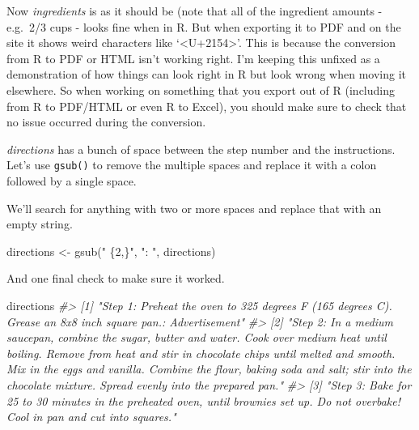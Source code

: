 \documentclass[
]{krantz}
\makeatletter
\newenvironment{Shaded}{\begin{snugshade}}{\end{snugshade}}
\newcommand{\CommentTok}[1]{\textcolor[rgb]{0.37,0.37,0.37}{\textit{#1}}}
\newcommand{\FunctionTok}[1]{\textcolor[rgb]{0,0,0}{#1}}
\newcommand{\NormalTok}[1]{#1}
\newcommand{\OtherTok}[1]{\textcolor[rgb]{0.37,0.37,0.37}{#1}}
\newcommand{\StringTok}[1]{\textcolor[rgb]{0.5,0.5,0.5}{#1}}
\newenvironment{kframe}{%
\medskip{}
\setlength{\fboxsep}{.8em}
 \def\at@end@of@kframe{}%
 \ifinner\ifhmode%
  \def\at@end@of@kframe{\end{minipage}}%
  \begin{minipage}{\columnwidth}%
 \fi\fi%
 \def\FrameCommand##1{\hskip\@totalleftmargin \hskip-\fboxsep
 \colorbox{shadecolor}{##1}\hskip-\fboxsep
     \hskip-\linewidth \hskip-\@totalleftmargin \hskip\columnwidth}%
 \MakeFramed {\advance\hsize-\width
   \@totalleftmargin\z@ \linewidth\hsize
   \@setminipage}}%
 {\par\unskip\endMakeFramed%
 \at@end@of@kframe}
\renewenvironment{Shaded}{\begin{kframe}}{\end{kframe}}
\makeatother
\begin{document}
Now \emph{ingredients} is as it should be (note that all of the ingredient amounts - e.g.~2/3 cups - looks fine when in R. But when exporting it to PDF and on the site it shows weird characters like `\textless U+2154\textgreater{}'. This is because the conversion from R to PDF or HTML isn't working right. I'm keeping this unfixed as a demonstration of how things can look right in R but look wrong when moving it elsewhere. So when working on something that you export out of R (including from R to PDF/HTML or even R to Excel), you should make sure to check that no issue occurred during the conversion.

\emph{directions} has a bunch of space between the step number and the instructions. Let's use \texttt{gsub()} to remove the multiple spaces and replace it with a colon followed by a single space.

We'll search for anything with two or more spaces and replace that with an empty string.

\begin{Shaded}
\begin{Highlighting}[]
\NormalTok{directions }\OtherTok{\textless{}{-}} \FunctionTok{gsub}\NormalTok{(}\StringTok{" \{2,\}"}\NormalTok{, }\StringTok{": "}\NormalTok{, directions)}
\end{Highlighting}
\end{Shaded}

And one final check to make sure it worked.

\begin{Shaded}
\begin{Highlighting}[]
\NormalTok{directions}
\CommentTok{\#\textgreater{} [1] "Step 1: Preheat the oven to 325 degrees F (165 degrees C). Grease an 8x8 inch square pan.: Advertisement"                                                                                                                                                                                                                 }
\CommentTok{\#\textgreater{} [2] "Step 2: In a medium saucepan, combine the sugar, butter and water. Cook over medium heat until boiling. Remove from heat and stir in chocolate chips until melted and smooth. Mix in the eggs and vanilla. Combine the flour, baking soda and salt; stir into the chocolate mixture. Spread evenly into the prepared pan."}
\CommentTok{\#\textgreater{} [3] "Step 3: Bake for 25 to 30 minutes in the preheated oven, until brownies set up. Do not overbake! Cool in pan and cut into squares."}
\end{Highlighting}
\end{Shaded}
\end{document}
